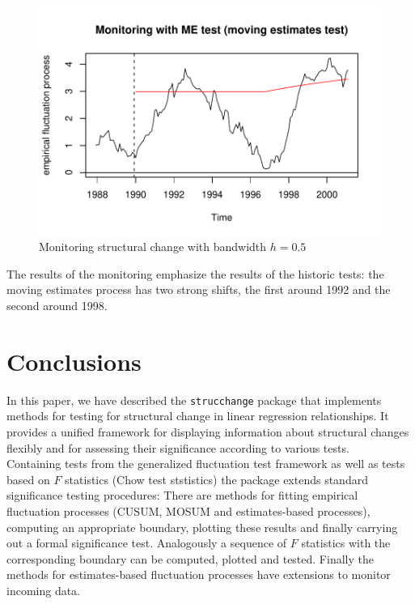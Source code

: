 \documentclass[10pt,a4paper]{article}
\begin{document}
\begin{figure}[htbp]
\begin{center}
\includegraphics{strucchange-intro-monitor-plot2}
\caption{\label{fig:monitor2} Monitoring structural change with
bandwidth $h=0.5$} \end{center}
\end{figure}

The results of the monitoring emphasize the results of the historic tests: the
moving estimates process has two strong shifts, the first around 1992 and the
second around 1998.

\section{Conclusions} \label{sec:conclusions}

In this paper, we have described the {\tt strucchange} package that implements
methods for testing for structural change in linear regression relationships.
It provides a unified framework for displaying information
about structural changes flexibly and for assessing their significance
according to various tests.\\

Containing tests from the generalized fluctuation test framework as well as
tests based on $F$ statistics (Chow test ststistics) the package extends
standard significance testing procedures: There are methods for fitting
empirical fluctuation processes (CUSUM, MOSUM and estimates-based
processes), computing an appropriate boundary, plotting these results and
finally carrying out a formal significance test. Analogously a sequence of $F$
statistics with the corresponding boundary can be computed, plotted and tested.
Finally the methods for estimates-based fluctuation processes have extensions to
monitor incoming data.
\end{document}
